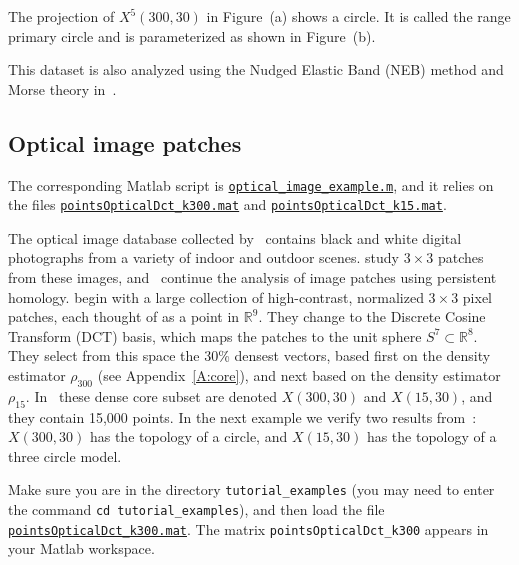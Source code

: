 \documentclass[amscd, amssymb, verbatim]{amsart}[12pt]
\theoremstyle{remark}
\theoremstyle{remark}
\theoremstyle{remark}
\newcommand{\R}{\mathbb{R}}
\begin{document}
The projection of $X^5(300,30)$ in Figure~(a) shows a circle. It is called the range primary circle and is parameterized as shown in Figure~(b).

This dataset is also analyzed using the Nudged Elastic Band (NEB) method and Morse theory in~\citet{adams2015nudged}.


\subsection{Optical image patches}

The corresponding Matlab script is \href{https://github.com/appliedtopology/javaplex/tree/master/src/matlab/for_distribution/tutorial_examples/optical_image_example.m}{\texttt{optical\_image\_example.m}}, and it relies on the files \href{https://github.com/appliedtopology/javaplex/tree/master/src/matlab/for_distribution/tutorial_examples/pointsOpticalDct_k300.mat}{\texttt{pointsOpticalDct\_k300.mat}} and \href{https://github.com/appliedtopology/javaplex/tree/master/src/matlab/for_distribution/tutorial_examples/pointsOpticalDct_k15.mat}{\texttt{pointsOpticalDct\_k15.mat}}.

The optical image database collected by~\citet{VanHaterenVanDerSchaaf} contains black and white digital photographs from a variety of indoor and outdoor scenes. \citet{Mumford} study $3 \times 3$ patches from these images, and~\citet{KleinBottle} continue the analysis of image patches using persistent homology. \citet{KleinBottle} begin with a large collection of high-contrast, normalized $3 \times 3$ pixel patches, each thought of as a point in $\R^9$. They change to the Discrete Cosine Transform (DCT) basis, which maps the patches to the unit sphere $S^7 \subset \R^8$. They select from this space the 30\% densest vectors, based first on the density estimator $\rho_{300}$ (see Appendix~\ref{A:core}), and next based on the density estimator $\rho_{15}$. In~\citet{KleinBottle} these dense core subset are denoted $X(300,30)$ and $X(15,30)$, and they contain 15,000 points. In the next example we verify two results from~\citet{KleinBottle}: $X(300,30)$ has the topology of a circle, and $X(15,30)$ has the topology of a three circle model.

Make sure you are in the directory \texttt{tutorial\_examples} (you may need to enter the command \texttt{cd tutorial\_examples}), and then load the file \href{https://github.com/appliedtopology/javaplex/tree/master/src/matlab/for_distribution/tutorial_examples/pointsOpticalDct_k300.mat}{\texttt{pointsOpticalDct\_k300.mat}}. The matrix \texttt{pointsOpticalDct\_k300} appears in your Matlab workspace.
\end{document}
